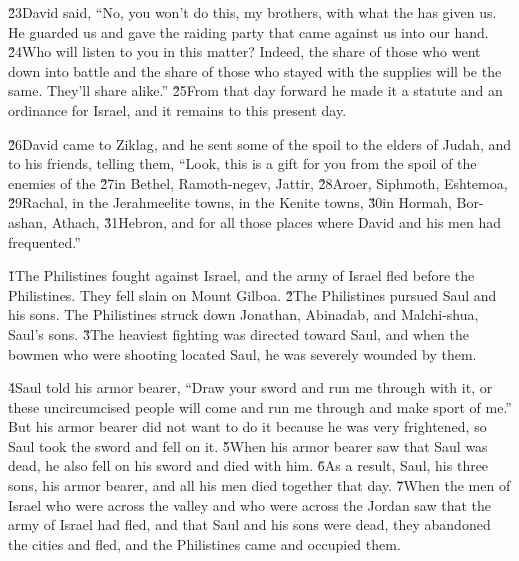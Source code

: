 \v{23}David said, ``No, you won't do this, my brothers, with what the  has given us. He guarded us and gave the raiding party that came against us into our hand. \v{24}Who will listen to you in this matter? Indeed, the share of those who went down into battle and the share of those who stayed with the supplies will be the same. They'll share alike.'' \v{25}From that day forward he made it a statute and an ordinance for Israel, and it remains to this present day.

\v{26}David came to Ziklag, and he sent some of the spoil to the elders of Judah, and to his friends, telling them, ``Look, this is a gift for you from the spoil of the enemies of the  \v{27}in Bethel, Ramoth-negev, Jattir, \v{28}Aroer, Siphmoth, Eshtemoa, \v{29}Rachal, in the Jerahmeelite towns, in the Kenite towns, \v{30}in Hormah, Bor-ashan, Athach, \v{31}Hebron, and for all those places where David and his men had frequented.''

\v{1}The Philistines fought against Israel, and the army of Israel fled before the Philistines. They fell slain on Mount Gilboa. \v{2}The Philistines pursued Saul and his sons. The Philistines struck down Jonathan, Abinadab, and Malchi-shua, Saul's sons. \v{3}The heaviest fighting was directed toward Saul, and when the bowmen who were shooting located Saul, he was severely wounded by them.

\v{4}Saul told his armor bearer, ``Draw your sword and run me through with it, or these uncircumcised people will come and run me through and make sport of me.'' But his armor bearer did not want to do it because he was very frightened, so Saul took the sword and fell on it. \v{5}When his armor bearer saw that Saul was dead, he also fell on his sword and died with him. \v{6}As a result, Saul, his three sons, his armor bearer, and all his men died together that day. \v{7}When the men of Israel who were across the valley and who were across the Jordan saw that the army of Israel had fled, and that Saul and his sons were dead, they abandoned the cities and fled, and the Philistines came and occupied them.


